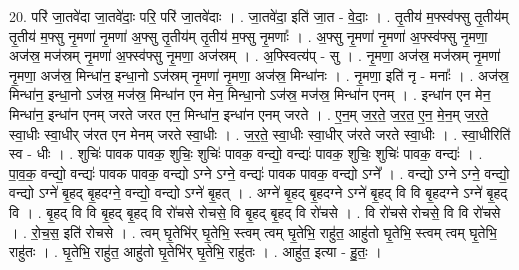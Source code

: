 \documentclass[17pt]{extarticle}
\begin{document}
20. परि॑ जा॒तवे॑दा जा॒तवे॑दाः॒ परि॒ परि॑ जा॒तवे॑दाः । . जा॒तवे॑दा॒ इति॑ जा॒त - वे॒दाः॒ । . तृ॒तीय॑ म॒फ्स्व॑फ्सु तृ॒तीय॑म् तृ॒तीय॑ म॒फ्सु नृ॒मणा॑ नृ॒मणा॑ अ॒फ्सु तृ॒तीय॑म् तृ॒तीय॑ म॒फ्सु नृ॒मणाः᳚ । . अ॒फ्सु नृ॒मणा॑ नृ॒मणा॑ अ॒फ्स्व॑फ्सु नृ॒मणा॒ अज॑स्र॒ मज॑स्रम् नृ॒मणा॑ अ॒फ्स्व॑फ्सु नृ॒मणा॒ अज॑स्रम् । . अ॒फ्स्वित्य॑प् - सु । . नृ॒मणा॒ अज॑स्र॒ मज॑स्रम् नृ॒मणा॑ नृ॒मणा॒ अज॑स्र॒ मिन्धा॑न॒ इन्धा॒नो ऽज॑स्रम् नृ॒मणा॑ नृ॒मणा॒ अज॑स्र॒ मिन्धा॑नः । . नृ॒मणा॒ इति॑ नृ - मनाः᳚ । . अज॑स्र॒ मिन्धा॑न॒ इन्धा॒नो ऽज॑स्र॒ मज॑स्र॒ मिन्धा॑न एन मेन॒ मिन्धा॒नो ऽज॑स्र॒ मज॑स्र॒ मिन्धा॑न एनम् । . इन्धा॑न एन मेन॒ मिन्धा॑न॒ इन्धा॑न एनम् जरते जरत एन॒ मिन्धा॑न॒ इन्धा॑न एनम् जरते । . ए॒न॒म् ज॒र॒ते॒ ज॒र॒त॒ ए॒न॒ मे॒न॒म् ज॒र॒ते॒ स्वा॒धीः स्वा॒धीर् ज॑रत एन मेनम् जरते स्वा॒धीः । . ज॒र॒ते॒ स्वा॒धीः स्वा॒धीर् ज॑रते जरते स्वा॒धीः । . स्वा॒धीरिति॑ स्व - धीः । . शुचिः॑ पावक पावक॒ शुचिः॒ शुचिः॑ पावक॒ वन्द्यो॒ वन्द्यः॑ पावक॒ शुचिः॒ शुचिः॑ पावक॒ वन्द्यः॑ । . पा॒व॒क॒ वन्द्यो॒ वन्द्यः॑ पावक पावक॒ वन्द्यो ऽग्ने ऽग्ने॒ वन्द्यः॑ पावक पावक॒ वन्द्यो ऽग्ने᳚ । . वन्द्यो ऽग्ने ऽग्ने॒ वन्द्यो॒ वन्द्यो ऽग्ने॑ बृ॒हद् बृ॒हदग्ने॒ वन्द्यो॒ वन्द्यो ऽग्ने॑ बृ॒हत् । . अग्ने॑ बृ॒हद् बृ॒हदग्ने ऽग्ने॑ बृ॒हद् वि वि बृ॒हदग्ने ऽग्ने॑ बृ॒हद् वि । . बृ॒हद् वि वि बृ॒हद् बृ॒हद् वि रो॑चसे रोचसे॒ वि बृ॒हद् बृ॒हद् वि रो॑चसे । . वि रो॑चसे रोचसे॒ वि वि रो॑चसे । . रो॒च॒स॒ इति॑ रोचसे । . त्वम् घृ॒तेभि॑र् घृ॒तेभि॒ स्त्वम् त्वम् घृ॒तेभि॒ राहु॑त॒ आहु॑तो घृ॒तेभि॒ स्त्वम् त्वम् घृ॒तेभि॒ राहु॑तः । . घृ॒तेभि॒ राहु॑त॒ आहु॑तो घृ॒तेभि॑र् घृ॒तेभि॒ राहु॑तः । . आहु॑त॒ इत्या - हु॒तः॒ । \newline
\end{document}
